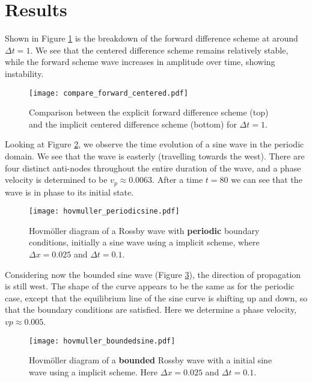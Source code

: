 \section{Results}
\label{sec:results}

Shown in Figure \ref{fig:compare} is the breakdown of the forward difference scheme at around $\Delta t = 1$. We see that the centered difference scheme remains relatively stable, while the forward scheme wave increases in amplitude over time, showing instability.
\begin{figure}[htbp]
	\centering
	\texttt{[image: compare\_forward\_centered.pdf]}
	\caption{Comparison between the explicit forward difference scheme (top) and the implicit centered difference scheme (bottom) for $\Delta t = 1$.}
	\label{fig:compare}
\end{figure}

Looking at Figure \ref{fig:hovmollerSinePeriodic}, we observe the time evolution of a sine wave in the periodic domain. We see that the wave is easterly (travelling towards the west). There are four distinct anti-nodes throughout the entire duration of the wave, and a phase velocity is determined to be $v_p \approx 0.0063$. After a time $t=80$ we can see that the wave is in phase to its initial state.
\begin{figure}[htbp]
	\centering
	\texttt{[image: hovmuller\_periodicsine.pdf]}
	\caption{Hovmöller diagram of a Rossby wave with \textbf{periodic} boundary conditions, initially a sine wave using a implicit scheme, where $\Delta x = 0.025$ and $\Delta t = 0.1$.}
	\label{fig:hovmollerSinePeriodic}
\end{figure}

Considering now the bounded sine wave (Figure \ref{fig:hovmollerSineBounded}), the direction of propagation is still west. The shape of the curve appears to be the same as for the periodic case, except that the equilibrium line of the sine curve is shifting up and down, so that the boundary conditions are satisfied. Here we determine a phase velocity, $vp \approx 0.005$.
\begin{figure}[htbp]
	\centering
	\texttt{[image: hovmuller\_boundedsine.pdf]}
	\caption{Hovmöller diagram of a \textbf{bounded} Rossby wave with a initial sine wave using a implicit scheme. Here $\Delta x = 0.025$ and $\Delta t = 0.1$.}
	\label{fig:hovmollerSineBounded}
\end{figure}

